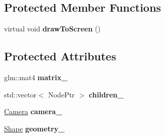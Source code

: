 \subsection*{\-Protected \-Member \-Functions}
\begin{DoxyCompactItemize}
\item 
\hypertarget{classs9_1_1Node_ad6633dd1b9e4603da3762be17255fba2}{virtual void {\bfseries draw\-To\-Screen} ()}\label{classs9_1_1Node_ad6633dd1b9e4603da3762be17255fba2}

\end{DoxyCompactItemize}
\subsection*{\-Protected \-Attributes}
\begin{DoxyCompactItemize}
\item 
\hypertarget{classs9_1_1Node_a00b308a9c2fbd493a835bc4b3c7b9aaa}{glm\-::mat4 {\bfseries matrix\-\_\-}}\label{classs9_1_1Node_a00b308a9c2fbd493a835bc4b3c7b9aaa}

\item 
\hypertarget{classs9_1_1Node_a2f74e3b79b870b7eeec0c35bb7859fbe}{std\-::vector$<$ \-Node\-Ptr $>$ {\bfseries children\-\_\-}}\label{classs9_1_1Node_a2f74e3b79b870b7eeec0c35bb7859fbe}

\item 
\hypertarget{classs9_1_1Node_ae63d2d14dcb745d31000ef8136119295}{\hyperlink{classs9_1_1Camera}{\-Camera} {\bfseries camera\-\_\-}}\label{classs9_1_1Node_ae63d2d14dcb745d31000ef8136119295}

\item 
\hypertarget{classs9_1_1Node_a916d78aba871fce8b054b9d2a7e03121}{\hyperlink{classs9_1_1Shape}{\-Shape} {\bfseries geometry\-\_\-}}\label{classs9_1_1Node_a916d78aba871fce8b054b9d2a7e03121}

\end{DoxyCompactItemize}


